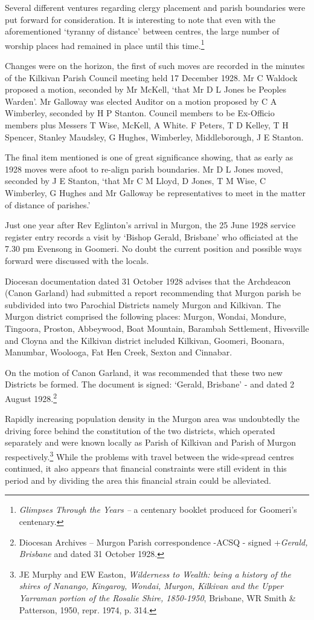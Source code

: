Several different ventures regarding clergy placement and parish boundaries were put forward for consideration. It is interesting to note that even with the aforementioned `tyranny of distance' between centres, the large number of worship places had remained in place until this time.\footnote{\emph{Glimpses Through the Years --} a centenary booklet produced for Goomeri's centenary.}

Changes were on the horizon, the first of such moves are recorded in the minutes of the Kilkivan Parish Council meeting held 17 December 1928. Mr C Waldock proposed a motion, seconded by Mr McKell, `that Mr D L Jones be Peoples Warden'. Mr Galloway was elected Auditor on a motion proposed by C A Wimberley, seconded by H P Stanton. Council members to be Ex-Officio members plus Messers T Wise, McKell, A White. F Peters, T D Kelley, T H Spencer, Stanley Maudsley, G Hughes, Wimberley, Middleborough, J E Stanton.

The final item mentioned is one of great significance showing, that as early as 1928 moves were afoot to re-align parish boundaries. Mr D L Jones moved, seconded by J E Stanton, `that Mr C M Lloyd, D Jones, T M Wise, C Wimberley, G Hughes and Mr Galloway be representatives to meet in the matter of distance of parishes.'

Just one year after Rev Eglinton's arrival in Murgon, the 25 June 1928 service register entry records a visit by `Bishop Gerald, Brisbane' who officiated at the 7.30 pm Evensong in Goomeri. No doubt the current position and possible ways forward were discussed with the locals.

Diocesan documentation dated 31 October 1928 advises that the Archdeacon (Canon Garland) had submitted a report recommending that Murgon parish be subdivided into two Parochial Districts namely Murgon and Kilkivan. The Murgon district comprised the following places: Murgon, Wondai, Mondure, Tingoora, Proston, Abbeywood, Boat Mountain, Barambah Settlement, Hivesville and Cloyna and the Kilkivan district included Kilkivan, Goomeri, Boonara, Manumbar, Woolooga, Fat Hen Creek, Sexton and Cinnabar.

On the motion of Canon Garland, it was recommended that these two new Districts be formed. The document is signed: `Gerald, Brisbane' - and dated 2 August 1928.\footnote{Diocesan Archives -- Murgon Parish correspondence -ACSQ - signed +\emph{Gerald, Brisbane} and dated 31 October 1928.}

Rapidly increasing population density in the Murgon area was undoubtedly the driving force behind the constitution of the two districts, which operated separately and were known locally as Parish of Kilkivan and Parish of Murgon respectively.\footnote{JE Murphy and EW Easton, \emph{Wilderness to Wealth: being a history of the shires of Nanango, Kingaroy, Wondai, Murgon, Kilkivan and the Upper Yarraman portion of the Rosalie Shire, 1850-1950}, Brisbane, WR Smith \& Patterson, 1950, repr. 1974, p. 314.} While the problems with travel between the wide-spread centres continued, it also appears that financial constraints were still evident in this period and by dividing the area this financial strain could be alleviated.

